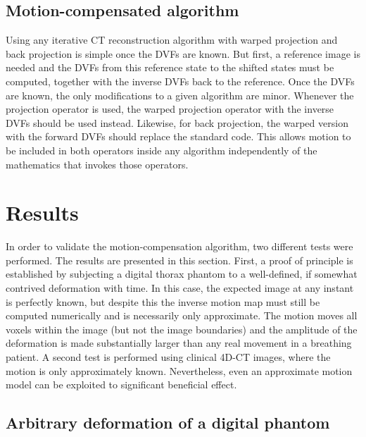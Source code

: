 \subsection{Motion-compensated algorithm}

Using any iterative CT reconstruction algorithm with warped projection and back projection is simple once the DVFs are known.  But first, a reference image is needed and the DVFs from this reference state to the shifted states must be computed, together with the inverse DVFs back to the reference. Once the DVFs are known, the only modifications to a given algorithm are minor.  Whenever the projection operator is used, the warped projection operator with the inverse DVFs should be used instead.  Likewise, for back projection, the warped version with the forward DVFs should replace the standard code.  This allows motion to be included in both operators inside any algorithm independently of the mathematics that invokes those operators.





\section{Results}

In order to validate the motion-compensation algorithm, two different tests were performed.  The results are presented in this section.  First, a proof of principle is established by subjecting a digital thorax phantom to a well-defined, if somewhat contrived deformation with time.  In this case, the expected image at any instant is perfectly known, but despite this the inverse motion map must still be computed numerically and is necessarily only approximate.  The motion moves all voxels within the image (but not the image boundaries) and the amplitude of the deformation is made substantially larger than any real movement in a breathing patient.  A second test is performed using clinical 4D-CT images, where the motion is only approximately known.  Nevertheless, even an approximate motion model can be exploited to significant beneficial effect.



\subsection{Arbitrary deformation of a digital phantom}

